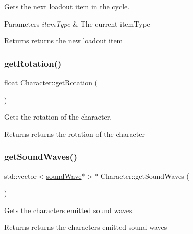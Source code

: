 Gets the next loadout item in the cycle. 


\begin{DoxyParams}{Parameters}
{\em item\+Type} & The current item\+Type \\
\hline
\end{DoxyParams}
\begin{DoxyReturn}{Returns}
returns the new loadout item 
\end{DoxyReturn}
\mbox{\label{class_character_ae60bb73ddd9c7175c78f61a8332ea8f4}} 
\subsubsection{\texorpdfstring{get\+Rotation()}{getRotation()}}
{\footnotesize\ttfamily float Character\+::get\+Rotation (\begin{DoxyParamCaption}{ }\end{DoxyParamCaption})}



Gets the rotation of the character. 

\begin{DoxyReturn}{Returns}
returns the rotation of the character 
\end{DoxyReturn}
\mbox{\label{class_character_a66131b3b77693e6ceea53b498f90f949}} 
\subsubsection{\texorpdfstring{get\+Sound\+Waves()}{getSoundWaves()}}
{\footnotesize\ttfamily std\+::vector$<$\hyperlink{classsound_wave}{sound\+Wave}$\ast$$>$$\ast$ Character\+::get\+Sound\+Waves (\begin{DoxyParamCaption}{ }\end{DoxyParamCaption})}



Gets the characters emitted sound waves. 

\begin{DoxyReturn}{Returns}
returns the characters emitted sound waves 
\end{DoxyReturn}
\mbox{\label{class_character_a46e4df688f2a4b6ec9368ada9445aa66}} 

